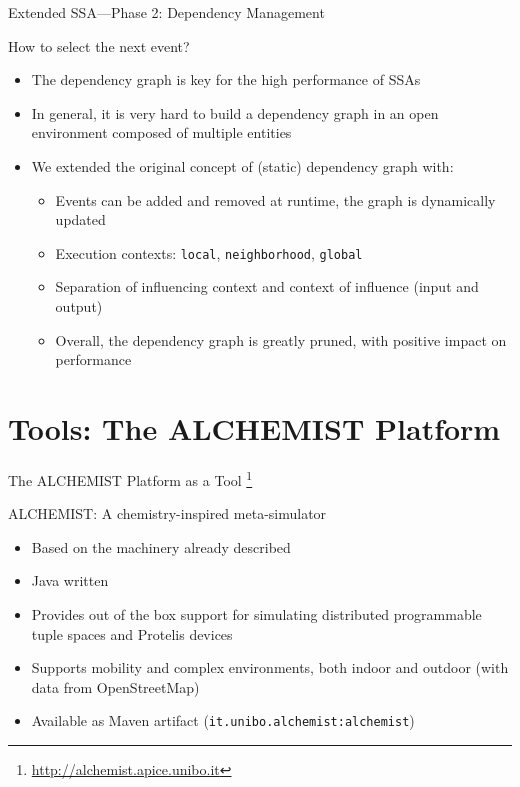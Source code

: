 \documentclass[presentation]{beamer} %
\newcommand{\alchemist}{{\sf ALCHEMIST}}
\begin{document}
\begin{frame}{Extended SSA---Phase 2: Dependency Management}
  \begin{block}{How to select the next event?}
    \begin{itemize}
      \item The dependency graph is key for the high performance of SSAs \cite{slepoy2008}
      \item In general, it is very hard to build a dependency graph in an open environment composed of multiple entities
      \item We extended the original concept of (static) dependency graph with:
      \begin{itemize}
        \item Events can be added and removed at runtime, the graph is dynamically updated
        \item Execution contexts: \texttt{local}, \texttt{neighborhood}, \texttt{global}
        \item Separation of influencing context and context of influence (input and output)
        \item Overall, the dependency graph is greatly pruned, with positive impact on performance
      \end{itemize}
    \end{itemize}
  \end{block}
\end{frame}


\section{Tools: The \alchemist{} Platform}


\begin{frame}{The \alchemist{} Platform as a Tool \footnote{\url{http://alchemist.apice.unibo.it}}}
  \begin{block}{\alchemist{}: A chemistry-inspired meta-simulator}
    \begin{itemize}
      \item Based on the machinery already described
      \item Java written
      \item Provides out of the box support for simulating distributed programmable tuple spaces and Protelis \cite{protelis} devices
      \item Supports mobility and complex environments, both indoor and outdoor (with data from OpenStreetMap)
      \item Available as Maven artifact (\texttt{it.unibo.alchemist:alchemist})
    \end{itemize}
  \end{block}
\end{frame}
\end{document}
